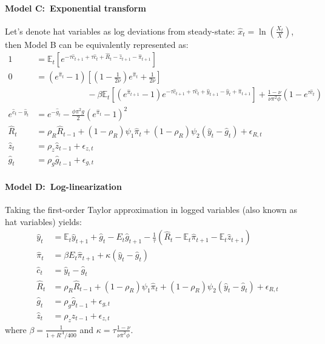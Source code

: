 \paragraph{Model C:\ Exponential transform}
Let's denote hat variables as log deviations from steady-state: \(\hat{x}_t = \ln\left(\frac{X_t}{X}\right)\), then Model B can be equivalently represented as:
\begin{align}
1 &= \mathbb{E}_t \left[e^{-\tau \hat{c}_{t+1} + \tau \hat{c}_{t} + \hat{R}_{t} - \hat{z}_{t+1} - \hat{\pi}_{t+1} }\right]\label{eq:AS_C1}
\\
0 &= \left(e^{\hat{\pi}_{t}}-1\right) \left[\left(1-\frac{1}{2\nu}\right)e^{\hat{\pi}_{t}} + \frac{1}{2\nu}\right] \nonumber
\\&\qquad\qquad\qquad
- \beta \mathbb{E}_t \left[\left(e^{\hat{\pi}_{t+1}}-1 \right) e^{-\tau \hat{c}_{t+1} + \tau \hat{c}_{t} + \hat{y}_{t+1} - \hat{y}_{t} + \hat{\pi}_{t+1}}\right] + \frac{1-\nu}{\nu\pi^2\phi}\left(1-e^{\tau\hat{c}_{t}}\right)
\\
e^{\hat{c}_{t}-\hat{y}_{t}} &= e^{-\hat{g}_{t}} - \frac{\phi \pi^2 g}{2} {\left(e^{\hat{\pi}_{t}}-1\right)}^2\label{eq:AS_C3}
\\
\hat{R}_{t} &= \rho_R \hat{R}_{t-1} + (1-\rho_R) \psi_1 \hat{\pi}_{t} + (1-\rho_R)\psi_2(\hat{y}_{t}-\hat{g}_{t}) + \epsilon_{R,t}
\\
\hat{z}_{t} &= \rho_z \hat{z}_{t-1} + \epsilon_{z,t}
\\
\hat{g}_{t} &= \rho_g \hat{g}_{t-1} + \epsilon_{g,t}
\end{align}

\paragraph{Model D:\ Log-linearization}
Taking the first-order Taylor approximation in logged variables (also known as hat variables) yields:
\begin{align}
\hat{y}_{t} &= \mathbb{E}_t \hat{y}_{t+1} + \hat{g}_{t} - E_t\hat{g}_{t+1} - \frac{1}{\tau} \left(\hat{R}_{t}- \mathbb{E}_t \hat{\pi}_{t+1} - \mathbb{E}_t \hat{z}_{t+1}\right) \label{eq:AS_D1}
\\
\hat{\pi}_{t} &= \beta E_t\hat{\pi}_{t+1} + \kappa \left(\hat{y}_{t} - \hat{g}_{t}\right)
\\
\hat{c}_{t} &= \hat{y}_{t} - \hat{g}_{t}
\\
\hat{R}_{t} &= \rho_R \hat{R}_{t-1} + (1-\rho_R) \psi_1 \hat{\pi}_{t} + (1-\rho_R)\psi_2(\hat{y}_{t}-\hat{g}_{t}) + \epsilon_{R,t}
\\
\hat{g}_{t} &= \rho_g \hat{g}_{t-1} + \epsilon_{g,t}
\\
\hat{z}_{t} &= \rho_z \hat{z}_{t-1} + \epsilon_{z,t}
\end{align}
where \(\beta = \frac{1}{1+R^{A}/400}\) and \(\kappa=\tau\frac{1-\nu}{\nu\bar{\pi}^2\phi}\).

